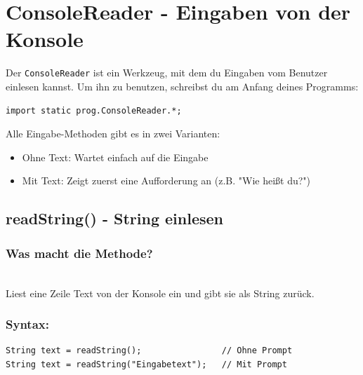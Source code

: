 \newpage


\section*{ConsoleReader - Eingaben von der Konsole}

Der \texttt{ConsoleReader} ist ein Werkzeug, mit dem du Eingaben vom Benutzer einlesen kannst.
Um ihn zu benutzen, schreibst du am Anfang deines Programms:

\begin{lstlisting}
import static prog.ConsoleReader.*;
\end{lstlisting}

Alle Eingabe-Methoden gibt es in zwei Varianten:
\begin{itemize}
	\item Ohne Text: Wartet einfach auf die Eingabe
	\item Mit Text: Zeigt zuerst eine Aufforderung an (z.B. "Wie heißt du?")
\end{itemize}

\newpage


\subsection*{readString() - String einlesen}

\subsubsection*{Was macht die Methode?}\\
Liest eine Zeile Text von der Konsole ein und gibt sie als String zurück.

\subsubsection*{Syntax:}
\begin{lstlisting}
String text = readString();                // Ohne Prompt
String text = readString("Eingabetext");   // Mit Prompt
\end{lstlisting}

